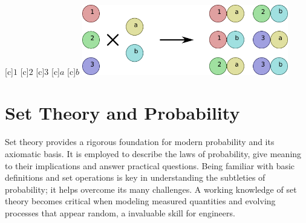 \begin{center}
\begin{psfrags}
[c]{$1$}
[c]{$2$}
[c]{$3$}
[c]{$a$}
[c]{$b$}
\includegraphics[height=3.06cm]{Figures/1Chapter/cartesianproduct}
\end{psfrags}
\end{center}


\section{Set Theory and Probability}

Set theory provides a rigorous foundation for modern probability and its axiomatic basis.
It is employed to describe the laws of probability, give meaning to their implications and answer practical questions.
Being familiar with basic definitions and set operations is key in understanding the subtleties of probability; it helps overcome its many challenges.
A working knowledge of set theory becomes critical when modeling measured quantities and evolving processes that appear random, a invaluable skill for engineers.

